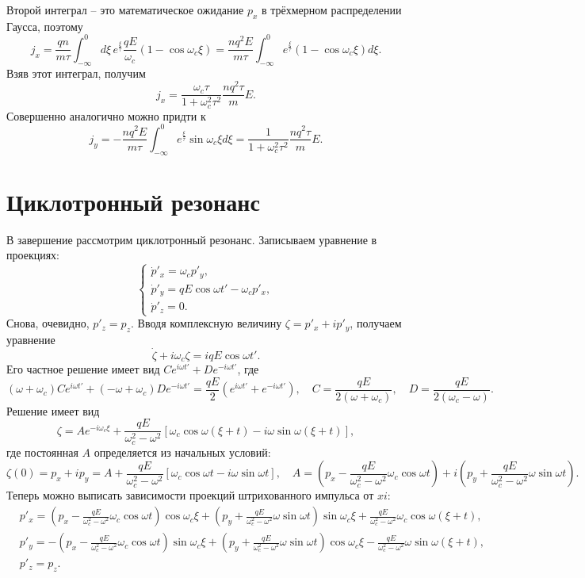 Второй интеграл -- это математическое ожидание \( p_x \) в трёхмерном
распределении Гаусса, поэтому
\[
    j_x = \frac{qn}{m\tau} \int_{-\infty}^0 d\xi\, e^\frac{\xi}{\tau}
    \frac{qE}{\omega_c}(1-\cos\omega_c\xi) =
    \frac{nq^2E}{m\tau}
    \int_{-\infty}^0e^\frac{\xi}{\tau}(1-\cos\omega_c\xi)d\xi.
\]
Взяв этот интеграл, получим
\[
    j_x = \frac{\omega_c\tau}{1+\omega_c^2\tau^2}\frac{nq^2\tau}{m}E.
\]
Совершенно аналогично можно придти к
\[
    j_y = -\frac{nq^2E}{m\tau}
    \int_{-\infty}^0e^\frac{\xi}{\tau}\sin\omega_c\xi d\xi =
    \frac{1}{1+\omega_c^2\tau^2}\frac{nq^2\tau}{m}E.
\]

\section{Циклотронный резонанс}
В завершение рассмотрим циклотронный резонанс. Записываем уравнение в проекциях:
\[
    \left\{
        \begin{array}{l}
            \dot{p}'_x = \omega_c p'_y, \\
            \dot{p}'_y = qE\cos\omega t' - \omega_c p'_x, \\
            \dot{p}'_z = 0.
        \end{array}
    \right.
\]
Снова, очевидно, \( p'_z = p_z \). Вводя комплексную величину
\( \zeta = p'_x + ip'_y \), получаем уравнение
\[
    \dot\zeta + i\omega_c\zeta = iqE\cos\omega t'.
\]
Его частное решение имеет вид \( Ce^{i\omega t'} + De^{-i\omega t'} \), где
\[
    (\omega + \omega_c)Ce^{i\omega t'} + (-\omega + \omega_c)De^{-i\omega t'}=
    \frac{qE}{2}(e^{i\omega t'} + e^{-i\omega t'}),
    \quad C = \frac{qE}{2(\omega + \omega_c)},
    \quad D = \frac{qE}{2(\omega_c - \omega)}.
\]
Решение имеет вид 
\[
    \zeta = Ae^{-i\omega_c \xi} +
    \frac{qE}{\omega_c^2 - \omega^2}[\omega_c\cos\omega(\xi+t) -
    i\omega\sin\omega(\xi+t)],
\]
где постоянная \( A \) определяется из начальных условий:
\[
    \zeta(0) = p_x + ip_y = A + 
    \frac{qE}{\omega_c^2 - \omega^2}[\omega_c\cos\omega t -
    i\omega\sin\omega t], \quad
    A =\left(p_x - \frac{qE}{\omega_c^2 - \omega^2}\omega_c\cos\omega t\right) +
    i\left(p_y + \frac{qE}{\omega_c^2 - \omega^2}\omega\sin\omega t\right).
\]
Теперь можно выписать зависимости проекций штрихованного импульса от \( xi \):
\begin{align*}
    & p'_x =
        \left(p_x - \frac{qE}{\omega_c^2 - \omega^2}\omega_c\cos\omega t\right)
        \cos\omega_c\xi
        +
        \left(p_y + \frac{qE}{\omega_c^2 - \omega^2}\omega\sin\omega t\right)
        \sin\omega_c\xi
        +
        \frac{qE}{\omega_c^2 - \omega^2}\omega_c\cos\omega(\xi+t), \\
    & p'_y =
        -\left(p_x - \frac{qE}{\omega_c^2 - \omega^2}\omega_c\cos\omega t\right)
        \sin\omega_c\xi
        +
        \left(p_y + \frac{qE}{\omega_c^2 - \omega^2}\omega\sin\omega t\right)
        \cos\omega_c\xi
        -
        \frac{qE}{\omega_c^2 - \omega^2}\omega\sin\omega(\xi+t),\\
    & p'_z = p_z.
\end{align*}
